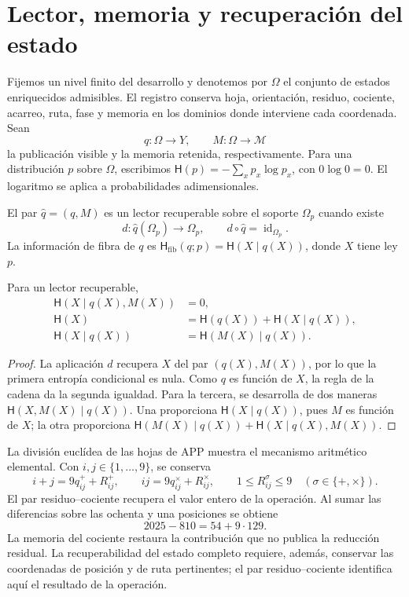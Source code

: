 \section{Lector, memoria y recuperación del estado}

Fijemos un nivel finito del desarrollo y denotemos por \(\Omega\) el
conjunto de estados enriquecidos admisibles. El registro conserva hoja,
orientación, residuo, cociente, acarreo, ruta, fase y memoria en los
dominios donde interviene cada coordenada. Sean
\[
 q:\Omega\longrightarrow Y,\qquad
 M:\Omega\longrightarrow\mathcal M
\]
la publicación visible y la memoria retenida, respectivamente. Para una
distribución \(p\) sobre \(\Omega\), escribimos
\(\mathsf H(p)=-\sum_xp_x\log p_x\), con \(0\log0=0\).
El logaritmo se aplica a probabilidades adimensionales.

\begin{definition}
El par \(\widehat q=(q,M)\) es un lector recuperable sobre el soporte
\(\Omega_p\) cuando existe
\[
 d:\widehat q(\Omega_p)\longrightarrow\Omega_p,
 \qquad d\circ\widehat q=\operatorname{id}_{\Omega_p}.
\]
La información de fibra de \(q\) es
\(\mathsf H_{\mathrm{fib}}(q;p)=\mathsf H(X\mid q(X))\), donde
\(X\) tiene ley \(p\).
\end{definition}

\begin{proposition}
Para un lector recuperable,
\begin{align}
 \mathsf H(X\mid q(X),M(X))&=0,\\
 \mathsf H(X)&=\mathsf H(q(X))+\mathsf H(X\mid q(X)),\\
 \mathsf H(X\mid q(X))&=\mathsf H(M(X)\mid q(X)).
 \label{x_reciprocidad:v:ant:eq:ii-kb-aut-fibra}
\end{align}
\end{proposition}
\begin{proof}
La aplicación \(d\) recupera \(X\) del par \((q(X),M(X))\),
por lo que la primera entropía condicional es nula. Como \(q\) es
función de \(X\), la regla de la cadena da la segunda igualdad.
Para la tercera, se desarrolla de dos maneras
\(\mathsf H(X,M(X)\mid q(X))\). Una proporciona
\(\mathsf H(X\mid q(X))\), pues \(M\) es función de \(X\);
la otra proporciona
\(\mathsf H(M(X)\mid q(X))+\mathsf H(X\mid q(X),M(X))\).
\end{proof}

La división euclídea de las hojas de APP muestra el mecanismo
aritmético elemental. Con \(i,j\in\{1,\ldots,9\}\), se conserva
\[
 i+j=9q^+_{ij}+R^+_{ij},\qquad
 ij=9q^\times_{ij}+R^\times_{ij},\qquad
 1\leq R^\sigma_{ij}\leq9\quad(\sigma\in\{+,\times\}).
\]
El par residuo--cociente recupera el valor entero de la operación.
Al sumar las diferencias sobre las ochenta y una posiciones se obtiene
\[
 2025-810=54+9\cdot129.
\]
La memoria del cociente restaura la contribución que no publica la
reducción residual. La recuperabilidad del estado completo requiere,
además, conservar las coordenadas de posición y de ruta pertinentes;
el par residuo--cociente identifica aquí el resultado de la operación.

